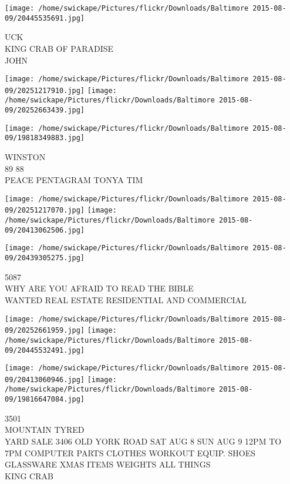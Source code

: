 \documentclass[10pt,letterpaper]{article}
\begin{document}
\vspace{0.25in}
\texttt{[image: /home/swickape/Pictures/flickr/Downloads/Baltimore 2015-08-09/20445535691.jpg]}

UCK\\
KING CRAB OF PARADISE\\
JOHN\\
\pagebreak

\texttt{[image: /home/swickape/Pictures/flickr/Downloads/Baltimore 2015-08-09/20251217910.jpg]}
\texttt{[image: /home/swickape/Pictures/flickr/Downloads/Baltimore 2015-08-09/20252663439.jpg]}

\vspace{0.25in}
\texttt{[image: /home/swickape/Pictures/flickr/Downloads/Baltimore 2015-08-09/19818349883.jpg]}

WINSTON\\
89 88\\
PEACE PENTAGRAM TONYA TIM\\
\pagebreak

\texttt{[image: /home/swickape/Pictures/flickr/Downloads/Baltimore 2015-08-09/20251217070.jpg]}
\texttt{[image: /home/swickape/Pictures/flickr/Downloads/Baltimore 2015-08-09/20413062506.jpg]}

\vspace{0.25in}
\texttt{[image: /home/swickape/Pictures/flickr/Downloads/Baltimore 2015-08-09/20439305275.jpg]}

5087\\
WHY ARE YOU AFRAID TO READ THE BIBLE\\
WANTED REAL ESTATE RESIDENTIAL AND COMMERCIAL\\
\pagebreak

\texttt{[image: /home/swickape/Pictures/flickr/Downloads/Baltimore 2015-08-09/20252661959.jpg]}
\texttt{[image: /home/swickape/Pictures/flickr/Downloads/Baltimore 2015-08-09/20445532491.jpg]}

\texttt{[image: /home/swickape/Pictures/flickr/Downloads/Baltimore 2015-08-09/20413060946.jpg]}
\texttt{[image: /home/swickape/Pictures/flickr/Downloads/Baltimore 2015-08-09/19816647084.jpg]}

3501\\
MOUNTAIN TYRED\\
YARD SALE 3406 OLD YORK ROAD SAT AUG 8 SUN AUG 9 12PM TO 7PM COMPUTER PARTS CLOTHES WORKOUT EQUIP. SHOES GLASSWARE XMAS ITEMS WEIGHTS ALL THINGS\\
KING CRAB\\
\pagebreak
\end{document}
